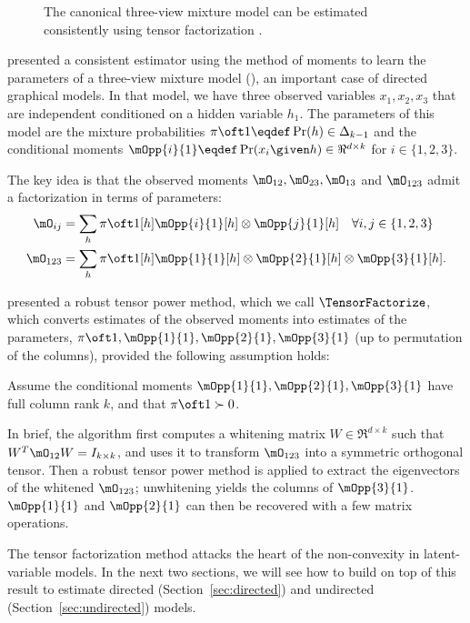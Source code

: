 \begin{figure}[t]
  \label{fig:three-view}
  \centering
  
  \caption{The canonical three-view mixture model can be estimated consistently using tensor factorization \citet{anandkumar13tensor}.}
\end{figure}

\citet{anandkumar12moments} presented a consistent estimator
  using the method of moments to learn the parameters of a three-view
  mixture model (), an important case of directed
  graphical models. %
In that model, we have three observed variables $x_1, x_2, x_3$
  that are independent conditioned on a hidden variable $h_1$.  
The parameters of this model are the mixture probabilities $\pi\oft 1 \eqdef
  \Pr(h) \in \Delta_{k-1}$ and the conditional moments $\mOpp{i}{1} \eqdef
  \Pr(x_i \given h) \in \Re^{d \times k}$ for $i \in \{1,2,3\}$.

  The key idea is that the observed moments $\mO_{12}, \mO_{23}, \mO_{13}$ and
  $\mO_{123}$ admit a factorization in terms of parameters:
\begin{align*}
  \mO_{ij} &= \sum_h {\pi \oft 1}[h] {\mOpp{i}{1}}[h] \otimes {\mOpp{j}{1}}[h] \quad \forall i,j \in \{1,2,3\} \\
  \mO_{123} &= \sum_h {\pi \oft 1}[h] {\mOpp{1}{1}}[h] \otimes {\mOpp{2}{1}}[h] \otimes  {\mOpp{3}{1}}[h].
\end{align*}

\citet{anandkumar13tensor} presented a robust tensor power method, which
  we call $\TensorFactorize$, which converts estimates of the observed moments 
  into estimates of the parameters, $\pi\oft 1, \mOpp{1}{1},
  \mOpp{2}{1},\mOpp{3}{1}$ (up to permutation of the columns), provided
  the following assumption holds:

\begin{assumption}
\label{asm:full-rank}
Assume the conditional moments $\mOpp{1}{1}, \mOpp{2}{1}, \mOpp{3}{1}$ have full column rank
  $k$, and that $\pi\oft 1 \succ 0$.
\end{assumption}

In brief, the algorithm first computes a whitening matrix $W \in
  \Re^{d \times k}$ such that $W^T \mO_{12} W = I_{k \times k}$,
  and uses it to transform $\mO_{123}$ into a symmetric orthogonal tensor.  
Then a robust tensor power method is applied to extract the eigenvectors
of the whitened $\mO_{123}$; unwhitening yields the columns of $\mOpp{3}{1}$.
  $\mOpp{1}{1}$ and $\mOpp{2}{1}$ can then be recovered with a few matrix operations.

The tensor factorization method attacks the heart of the non-convexity
  in latent-variable models.  In the next two sections,
  we will see how to build on top of this result to estimate directed (Section~\ref{sec:directed})
  and undirected (Section~\ref{sec:undirected}) models.
